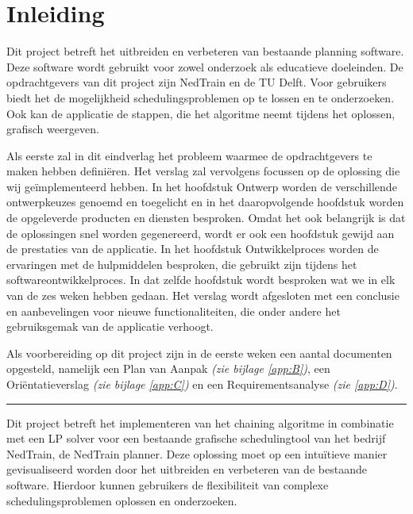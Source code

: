 \section{Inleiding}
Dit project betreft het uitbreiden en verbeteren van bestaande planning software. Deze software wordt gebruikt voor zowel onderzoek als educatieve doeleinden. De opdrachtgevers van dit project zijn NedTrain en de TU Delft. Voor gebruikers biedt het de mogelijkheid schedulingsproblemen op te lossen en te onderzoeken. Ook kan de applicatie de stappen, die het algoritme neemt tijdens het oplossen, grafisch weergeven. 

Als eerste zal in dit eindverlag het probleem waarmee de opdrachtgevers te maken hebben defini\"eren. Het verslag zal vervolgens focussen op de oplossing die wij ge\"implementeerd hebben. In het hoofdstuk Ontwerp worden de verschillende ontwerpkeuzes genoemd en toegelicht en in het daaropvolgende hoofdstuk worden de opgeleverde producten en diensten besproken. Omdat het ook belangrijk is dat de oplossingen snel worden gegenereerd, wordt er ook een hoofdstuk gewijd aan de prestaties van de applicatie. In het hoofdstuk Ontwikkelproces worden de ervaringen met de hulpmiddelen besproken, die gebruikt zijn tijdens het softwareontwikkelproces. In dat zelfde hoofdstuk wordt besproken wat we in elk van de zes weken hebben gedaan. Het verslag wordt afgesloten met een conclusie en aanbevelingen voor nieuwe functionaliteiten, die onder andere het gebruiksgemak van de applicatie verhoogt. 

Als voorbereiding op dit project zijn in de eerste weken een aantal documenten opgesteld, namelijk een Plan van Aanpak \emph{(zie bijlage \ref{app:B})}, een Ori\"entatieverslag \emph{(zie bijlage \ref{app:C})} en een Requirementsanalyse \emph{(zie \ref{app:D})}.

\rule{\textwidth}{1pt}

Dit project betreft het implementeren van het chaining algoritme in combinatie met een LP solver voor een bestaande grafische schedulingtool van het bedrijf NedTrain, de NedTrain planner. Deze oplossing moet op een intu\"itieve manier gevisualiseerd worden door het uitbreiden en verbeteren van de bestaande software. Hierdoor kunnen gebruikers de flexibiliteit van complexe schedulingsproblemen oplossen en onderzoeken.

